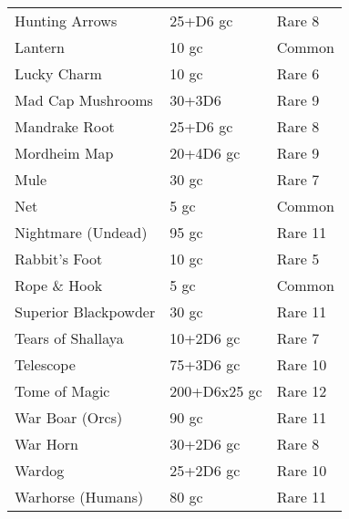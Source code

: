\begin{nscenter}
{\begin{tabular}{lll}
		Hunting Arrows        & 25+D6 gc      & Rare 8               \\
		Lantern               & 10 gc         & Common               \\
		Lucky Charm           & 10 gc         & Rare 6               \\
		Mad Cap Mushrooms     & 30+3D6        & Rare 9               \\
		Mandrake Root         & 25+D6 gc      & Rare 8               \\
		Mordheim Map          & 20+4D6 gc     & Rare 9               \\
		Mule                  & 30 gc         & Rare 7               \\
		Net                   & 5 gc          & Common               \\
		Nightmare (Undead)             & 95 gc         & Rare 11              \\
		Rabbit's Foot         & 10 gc         & Rare 5               \\
		Rope \& Hook          & 5 gc          & Common               \\
		Superior Blackpowder  & 30 gc         & Rare 11              \\
		Tears of Shallaya     & 10+2D6 gc     & Rare 7               \\
		Telescope             & 75+3D6 gc     & Rare 10              \\
		Tome of Magic         & 200+D6x25 gc  & Rare 12              \\
		War Boar (Orcs)              & 90 gc         & Rare 11              \\
		War Horn              & 30+2D6 gc     & Rare 8               \\
		Wardog                & 25+2D6 gc     & Rare 10              \\
		Warhorse (Humans)              & 80 gc         & Rare 11             
	\end{tabular}
}
\end{nscenter}